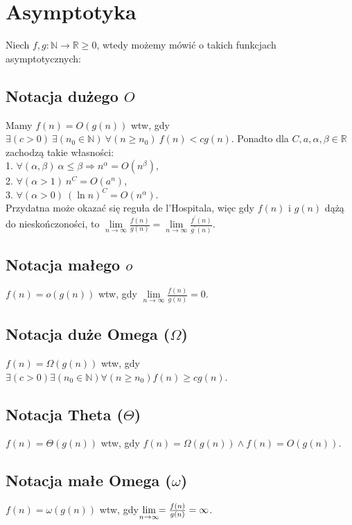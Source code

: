 \section{Asymptotyka}
Niech $f, g : \mathbb{N} \to \mathbb{R} \geq 0$, wtedy możemy mówić o takich
funkcjach asymptotycznych:

\subsection*{Notacja dużego $O$}
Mamy ${f(n) = O(g(n))}$ wtw, gdy
${\exists (c > 0)} \ {\exists (n_0 \in \mathbb{N})} \ {\forall (n \geq n_0)} \
{f(n) < cg(n)}$. Ponadto dla ${C, a, \alpha, \beta \in \mathbb{R}}$ zachodzą takie
własności: \\
1. $\forall (\alpha, \beta) \ \alpha \leq \beta \Rightarrow n^\alpha = O(n^\beta)$, \\
2. $\forall (\alpha > 1) \ n^C = O(a^n)$, \\
3. $\forall (\alpha > 0) \ (\ln n)^C = O(n^\alpha)$. \\
Przydatna może okazać się reguła de l'Hospitala, więc gdy $f(n)$ i $g(n)$ dążą do
nieskończoności, to ${\lim\limits_{n \to \infty} \frac{f(n)}{g(n)}} = 
{\lim\limits_{n \to \infty} \frac{f^\prime (n)}{g^\prime (n)}}$.

\subsection*{Notacja małego $o$}
${f(n) = o(g(n))}$ wtw, gdy $\lim\limits_{n \to \infty} \frac{f(n)}{g(n)} = 0$.

\subsection*{Notacja duże Omega ($\Omega$)}
$f(n) = \Omega(g(n))$ wtw, gdy ${\exists (c > 0)} {\exists (n_0 \in \mathbb{N})} 
{\forall (n \geq n_0)}  {f(n) \geq cg(n)}$.

\subsection*{Notacja Theta ($\Theta$)}
$f(n) = \Theta(g(n))$ wtw, gdy ${f(n) = \Omega(g(n))} \wedge {f(n) = O(g(n))}$.

\subsection*{Notacja małe Omega ($\omega$)}
$f(n) = \omega(g(n))$ wtw, gdy $\lim\limits_{\mathclap{n \to \infty}} = \frac{f(n)}{g(n)} = \infty$.